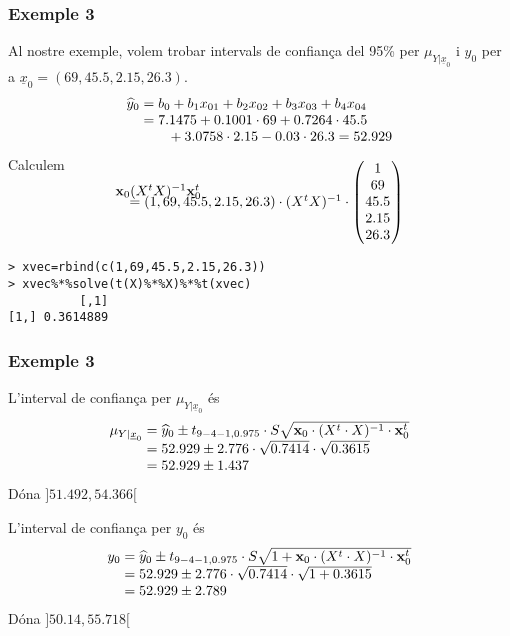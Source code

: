 \documentclass[12pt,t]{beamer}
\theoremstyle{plain}
\theoremstyle{definition}
\begin{document}
\begin{frame}[fragile]
\frametitle{Exemple 3}
Al nostre exemple, volem trobar intervals de confiança del 95\% per $\mu_{Y|\underline{x}_0}$ i ${y}_0$ per a $\underline{x}_0=(69,45.5,2.15,26.3)$.
$$
\begin{array}{l}
\widehat{y}_0=b_0+b_1x_{01}+b_2x_{02}+b_3x_{03}+b_4x_{04}\\
\hphantom{\widehat{y}_0}=7.1475+0.1001\cdot 69 +0.7264\cdot 45.5\\
\hphantom{\widehat{y}_0}\qquad +3.0758\cdot 2.15 -0.03\cdot 26.3= 52.929
\end{array}
$$
Calculem 
$$
\begin{array}{l}
\mathbf{x}_0 (X^t X)^{-1} \mathbf{x}_0^t\\[-1cm]
\quad =(1,69,45.5,2.15,26.3)\cdot (X^t X)^{-1}\cdot \left(\hspace*{-1ex}\begin{array}{c}
1\\ 69 \\ 45.5\\ 2.15 \\ 26.3\end{array}\hspace*{-1ex}
\right)
\end{array}
$$
\begin{verbatim}
> xvec=rbind(c(1,69,45.5,2.15,26.3))
> xvec%*%solve(t(X)%*%X)%*%t(xvec)
          [,1]
[1,] 0.3614889
\end{verbatim}
\end{frame}

\begin{frame}
\frametitle{Exemple 3}
L'interval de confiança per $\mu_{Y|\underline{x}_0}$ és
$$
\begin{array}{l}
\mu_{Y|\underline{x}_0}=\widehat{y}_0\pm t_{9-4-1,0.975}\cdot S\sqrt{\mathbf{x}_0\cdot(X^t  \cdot X)^{-1}\cdot \mathbf{x}_0^t}\\
\hphantom{\mu_{Y|\underline{x}_0}}=52.929\pm 2.776\cdot \sqrt{0.7414}\cdot \sqrt{0.3615}\\
\hphantom{\mu_{Y|\underline{x}_0}}=52.929\pm 1.437
\end{array}
$$
Dóna $]51.492,54.366[$
\medskip\pause

L'interval de confiança per $y_0$ és
$$
\begin{array}{l}
y_0=\widehat{y}_0\pm t_{9-4-1,0.975}\cdot S\sqrt{1+\mathbf{x}_0\cdot(X^t  \cdot X)^{-1}\cdot \mathbf{x}_0^t}\\
\hphantom{y_0}=52.929\pm 2.776\cdot \sqrt{0.7414}\cdot \sqrt{1+0.3615}\\
\hphantom{y_0}=52.929\pm 2.789
\end{array}
$$
Dóna $]50.14, 55.718[$
\end{frame}
\end{document}
